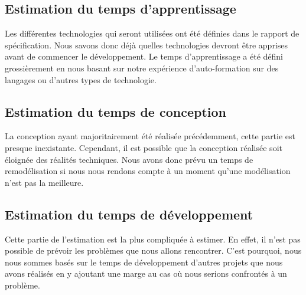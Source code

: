 \subsection{Estimation du temps d'apprentissage}

Les différentes technologies qui seront utilisées ont été définies dans le rapport de spécification. Nous savons donc déjà quelles technologies devront être apprises avant de commencer le développement. Le temps d’apprentissage a été défini grossièrement en nous basant sur notre expérience d’auto-formation sur des langages ou d’autres types de technologie.

\newpage

\subsection{Estimation du temps de conception}

La conception ayant majoritairement été réalisée précédemment, cette partie est presque inexistante. Cependant, il est possible que la conception réalisée soit éloignée des réalités techniques. Nous avons donc prévu un temps de remodélisation si nous nous rendons compte à un moment qu’une modélisation n’est pas la meilleure.

\subsection{Estimation du temps de développement}

Cette partie de l’estimation est la plus compliquée à estimer. En effet, il n’est pas possible de prévoir les problèmes que nous allons rencontrer. C’est pourquoi, nous nous sommes basés sur le temps de développement d’autres projets que nous avons réalisés en y ajoutant une marge au cas où nous serions confrontés à un problème.


